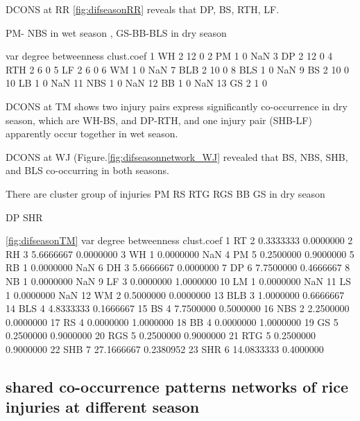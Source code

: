 DCONS at RR \ref{fig:difseasonRR} reveals that DP, BS, RTH, LF. 

PM- NBS in wet season , GS-BB-BLS in dry season

var degree betweenness clust.coef
1   WH      2          12          0
2   PM      1           0        NaN
3   DP      2          12          0
4  RTH      2           6          0
5   LF      2           6          0
6   WM      1           0        NaN
7  BLB      2          10          0
8  BLS      1           0        NaN
9   BS      2          10          0
10  LB      1           0        NaN
11 NBS      1           0        NaN
12  BB      1           0        NaN
13  GS      2           1          0

DCONS at TM shows two injury pairs express significantly co-occurrence in dry season, which are WH-BS, and DP-RTH, and one injury pair (SHB-LF) apparently occur together in wet season. 



DCONS at WJ (Figure.\ref{fig:difseasonnetwork_WJ} revealed that BS, NBS, SHB, and BLS co-occurring in both seasons.   

There are cluster group of injuries PM RS RTG RGS BB GS in dry season 

DP SHR

\ref{fig:difseasonTM}
   var degree betweenness clust.coef
1   RT      2   0.3333333  0.0000000
2   RH      3   5.6666667  0.0000000
3   WH      1   0.0000000        NaN
4   PM      5   0.2500000  0.9000000
5   RB      1   0.0000000        NaN
6   DH      3   5.6666667  0.0000000
7   DP      6   7.7500000  0.4666667
8   NB      1   0.0000000        NaN
9   LF      3   0.0000000  1.0000000
10  LM      1   0.0000000        NaN
11  LS      1   0.0000000        NaN
12  WM      2   0.5000000  0.0000000
13 BLB      3   1.0000000  0.6666667
14 BLS      4   4.8333333  0.1666667
15  BS      4   7.7500000  0.5000000
16 NBS      2   2.2500000  0.0000000
17  RS      4   0.0000000  1.0000000
18  BB      4   0.0000000  1.0000000
19  GS      5   0.2500000  0.9000000
20 RGS      5   0.2500000  0.9000000
21 RTG      5   0.2500000  0.9000000
22 SHB      7  27.1666667  0.2380952
23 SHR      6  14.0833333  0.4000000




\subsection{shared co-occurrence patterns networks of rice injuries at different season}

